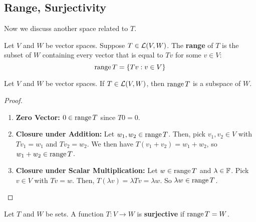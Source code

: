 \subsection*{Range, Surjectivity}
Now we discuss another space related to $T$.
\begin{definition}[Range]
    Let $V$ and $W$ be vector spaces. Suppose $T\in \mathcal{L}(V,W)$. The \textbf{range} of $T$ is the subset of $W$ containing every vector that is equal to $Tv$ for some $v\in V$:
    \[ \operatorname{range} T = \{ Tv: v\in V\}\]
\end{definition}
\begin{theorem}
    Let $V$ and $W$ be vector spaces. If $T\in\mathcal{L}(V,W)$, then $\operatorname{range} T$ is a subspace of $W$.
\end{theorem}
\begin{proof}
    \begin{enumerate}
        \item \textbf{Zero Vector:} $0\in \operatorname{range} T$ since $T0 = 0$. 
        \item \textbf{Closure under Addition:} Let $w_1, w_2 \in \operatorname{range} T$. Then, pick $v_1,v_2\in V$ with $Tv_1 = w_1$ and $Tv_2=w_2$. We then have $T(v_1+v_2) = w_1+w_2$, so $w_1+w_2 \in \operatorname{range} T$.
        \item \textbf{Closure under Scalar Multiplication:} Let $w\in \operatorname{range} T$ and $\lambda\in\mathbb F$. Pick $v\in V$ with $Tv = w$. Then, $T(\lambda v) = \lambda Tv = \lambda w$. So $\lambda w\in \operatorname{range} T$. 
    \end{enumerate}
\end{proof}
\begin{definition}[Surjective]
    Let $T$ and $W$ be sets. A function $T: V\to W$ is \textbf{surjective} if $\operatorname{range} T = W$.
\end{definition}
